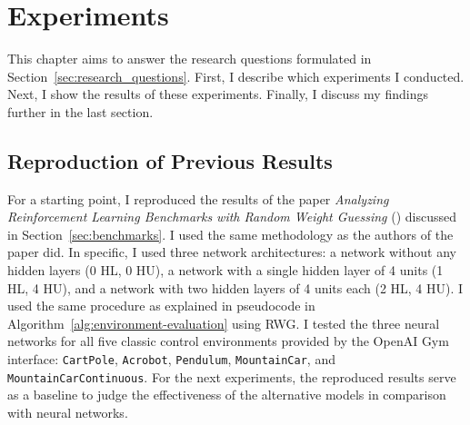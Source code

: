 
\chapter{Experiments}
\label{ch:experiments}
This chapter aims to answer the research questions formulated in Section~\ref{sec:research_questions}. First, I describe which experiments I conducted. Next, I show the results of these experiments. Finally, I discuss my findings further in the last section.

\section{Reproduction of Previous Results}
For a starting point, I reproduced the results of the paper \emph{Analyzing Reinforcement Learning Benchmarks with Random Weight Guessing} (\cite{oller_analyzing_2020}) discussed in Section~\ref{sec:benchmarks}. I used the same methodology as the authors of the paper did. In specific, I used three network architectures: a network without any hidden layers (0 HL, 0 HU), a network with a single hidden layer of 4 units (1 HL, 4 HU), and a network with two hidden layers of 4 units each (2 HL, 4 HU). I used the same procedure as explained in pseudocode in Algorithm~\ref{alg:environment-evaluation} using RWG. I tested the three neural networks for all five classic control environments provided by the OpenAI Gym interface: \verb|CartPole|, \verb|Acrobot|, \verb|Pendulum|, \verb|MountainCar|, and \verb|MountainCarContinuous|. For the next experiments, the reproduced results serve as a baseline to judge the effectiveness of the alternative models in comparison with neural networks.

